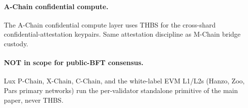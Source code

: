 \paragraph{A-Chain confidential compute.} The A-Chain confidential
compute layer uses THBS for the cross-shard confidential-attestation
keypairs. Same attestation discipline as M-Chain bridge custody.

\paragraph{NOT in scope for public-BFT consensus.} Lux P-Chain,
X-Chain, C-Chain, and the white-label EVM L1/L2s (Hanzo, Zoo, Pars
primary networks) run the per-validator standalone primitive of
the main paper, never THBS.
